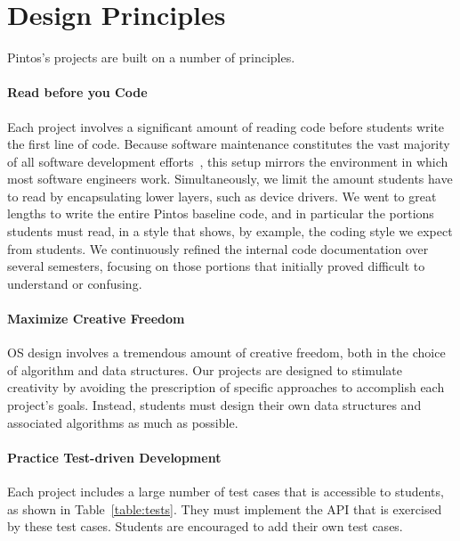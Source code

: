 \section{Design Principles}
\label{sec:designprinciples}

Pintos's projects are built on a number of principles.

\paragraph{Read before you Code}
Each project involves a significant amount of reading code before
students write the first line of code.
Because software maintenance constitutes the vast majority of all
software development efforts~\cite{Boehm1981Software}, this setup mirrors the 
environment in which most software engineers work.
Simultaneously, we limit the amount students have to read
by encapsulating lower layers, such as device drivers.
We went to great lengths to write the entire Pintos baseline code,
and in particular the portions students must read, in a style that shows,
by example, the coding style we expect from students.  
We continuously refined the internal code documentation over several
semesters, focusing on those 
portions that initially proved difficult to understand or confusing.

\paragraph{Maximize Creative Freedom}
OS design involves a tremendous amount of creative freedom, both in the
choice of algorithm and data structures.  Our projects are designed to
stimulate creativity by avoiding the prescription of specific approaches
to accomplish each project's goals.  Instead, students must design their
own data structures and associated algorithms as much as possible.

\paragraph{Practice Test-driven Development}
Each project includes a large number of test cases that is accessible
to students, as shown in  Table~\ref{table:tests}.  
They must implement the API that is exercised by these test cases.  
Students are encouraged to add their own test cases.

